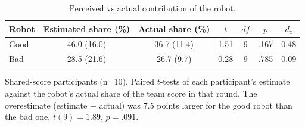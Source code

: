 \begin{table}[H]
\centering
\footnotesize
\begin{tabular}{lcccccc}
\toprule
\textbf{Robot} & \textbf{Estimated share (\%)} & \textbf{Actual share (\%)} & $t$ & $df$ & $p$ & $d_z$ \\
\midrule
Good & 46.0 (16.0) & 36.7 (11.4) & 1.51 & 9 & .167 & 0.48 \\
Bad & 28.5 (21.6) & 26.7 (9.7) & 0.28 & 9 & .785 & 0.09 \\
\bottomrule
\end{tabular}
\par\smallskip\raggedright\scriptsize Shared-score participants (n=10). Paired $t$-tests of each participant's estimate against the robot's actual share of the team score in that round. The overestimate (estimate $-$ actual) was 7.5 points larger for the good robot than the bad one, $t(9)=1.89$, $p=.091$.
\caption{Perceived vs actual contribution of the robot.}
\label{tab:contribution}
\end{table}

